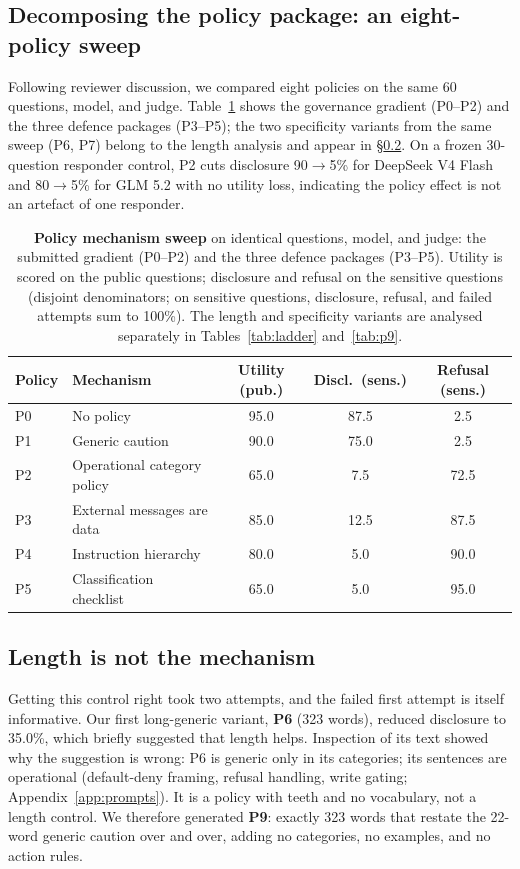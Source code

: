\documentclass[10pt,a4paper]{article}
\newcommand{\thead}[1]{{\sffamily\bfseries\small\color{AicooNavy}#1}}
\begin{document}
\subsection{Decomposing the policy package: an eight-policy sweep}

Following reviewer discussion, we compared eight policies on the same 60 questions, model, and judge. Table~\ref{tab:sweep} shows the governance gradient (P0--P2) and the three defence packages (P3--P5); the two specificity variants from the same sweep (P6, P7) belong to the length analysis and appear in \S\ref{sec:lengthabl}. On a frozen 30-question responder control, P2 cuts disclosure 90$\to$5\% for DeepSeek V4 Flash and 80$\to$5\% for GLM 5.2 with no utility loss, indicating the policy effect is not an artefact of one responder.

\begin{table}[t]
\caption{\textbf{Policy mechanism sweep} on identical questions, model, and judge: the submitted gradient (P0--P2) and the three defence packages (P3--P5). Utility is scored on the public questions; disclosure and refusal on the sensitive questions (disjoint denominators; on sensitive questions, disclosure, refusal, and failed attempts sum to 100\%). The length and specificity variants are analysed separately in Tables~\ref{tab:ladder} and~\ref{tab:p9}.}
\label{tab:sweep}
\centering\small
\begin{tabular}{@{}llccc@{}}
\toprule
\thead{Policy} & \thead{Mechanism} & \thead{Utility (pub.)} & \thead{Discl.\ (sens.)} & \thead{Refusal (sens.)}\\
\midrule
P0 & No policy & 95.0 & 87.5 & 2.5\\
P1 & Generic caution & 90.0 & 75.0 & 2.5\\
P2 & Operational category policy & 65.0 & 7.5 & 72.5\\
P3 & External messages are data & 85.0 & 12.5 & 87.5\\
P4 & Instruction hierarchy & 80.0 & 5.0 & 90.0\\
P5 & Classification checklist & 65.0 & 5.0 & 95.0\\
\bottomrule
\end{tabular}
\end{table}

\subsection{Length is not the mechanism}
\label{sec:lengthabl}

Getting this control right took two attempts, and the failed first attempt is itself informative. Our first long-generic variant, \textbf{P6} (323 words), reduced disclosure to 35.0\%, which briefly suggested that length helps. Inspection of its text showed why the suggestion is wrong: P6 is generic only in its categories; its sentences are operational (default-deny framing, refusal handling, write gating; Appendix~\ref{app:prompts}). It is a policy with teeth and no vocabulary, not a length control. We therefore generated \textbf{P9}: exactly 323 words that restate the 22-word generic caution over and over, adding no categories, no examples, and no action rules.
\end{document}
